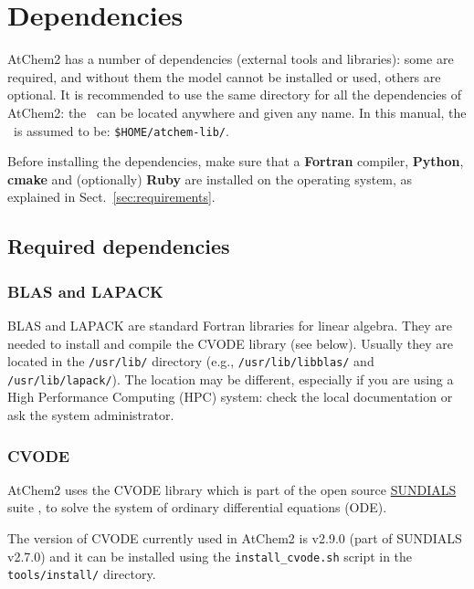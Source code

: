 \section{Dependencies} \label{sec:dependencies}

AtChem2 has a number of dependencies (external tools and libraries):
some are required, and without them the model cannot be installed or
used, others are optional. It is recommended to use the same directory
for all the dependencies of AtChem2: the \depdir\ can be located
anywhere and given any name. In this manual, the \depdir\ is
assumed to be: \texttt{\$HOME/atchem-lib/}.

Before installing the dependencies, make sure that a \textbf{Fortran}
compiler, \textbf{Python}, \textbf{cmake} and (optionally)
\textbf{Ruby} are installed on the operating system, as explained in
Sect.~\ref{sec:requirements}.

\subsection{Required dependencies} \label{subsec:required-dependencies}

\subsubsection{BLAS and LAPACK}

BLAS and LAPACK are standard Fortran libraries for linear
algebra. They are needed to install and compile the CVODE library (see
below). Usually they are located in the \texttt{/usr/lib/} directory
(e.g., \texttt{/usr/lib/libblas/} and \texttt{/usr/lib/lapack/}). The
location may be different, especially if you are using a High
Performance Computing (HPC) system: check the local documentation or
ask the system administrator.

\subsubsection{CVODE}

AtChem2 uses the CVODE library which is part of the open source
\href{https://computation.llnl.gov/projects/sundials}{SUNDIALS} suite
\citep{hindmarsh_2005}, to solve the system of ordinary differential
equations (ODE).

The version of CVODE currently used in AtChem2 is v2.9.0 (part of
SUNDIALS v2.7.0) and it can be installed using the \texttt{install\_cvode.sh}
script in the \texttt{tools/install/} directory.

